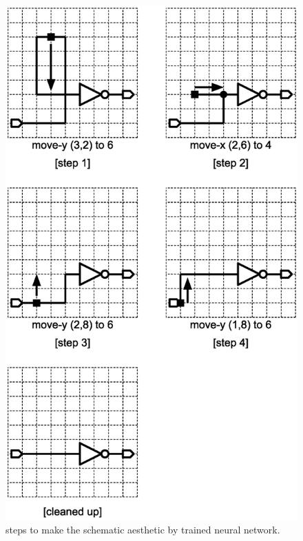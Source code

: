 \documentclass[twocolumn]{article}
\begin{document}
\begin{figure}[!tp]
 \begin{center}
  \begin{minipage}{\hsize}
   \includegraphics[width=\hsize]{fig/edit_steps_02.eps}
   \caption{steps to make the schematic aesthetic by trained neural network.}
   \label{fig:edit_steps}
  \end{minipage}
 \end{center}
\end{figure}
\end{document}
